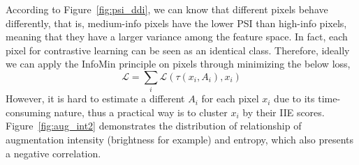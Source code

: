 \documentclass[10pt,twocolumn,letterpaper]{article}
\begin{document}

According to Figure~\ref{fig:psi_ddi}, we can know that different pixels behave differently, that is, medium-info pixels have the lower PSI than high-info pixels, meaning that they have a larger variance among the feature space. In fact, each pixel for contrastive learning can be seen as an identical class. Therefore, ideally we can apply the InfoMin principle on pixels through minimizing the below loss,
\begin{equation}
    \mathcal{L} = \sum_i \mathcal{L}(\tau(x_i, A_i), x_i)
\end{equation}
However, it is hard to estimate a different $A_i$ for each pixel $x_i$ due to its time-consuming nature, thus a practical way is to cluster $x_i$ by their IIE scores. 
Figure~\ref{fig:aug_int2} demonstrates the distribution of relationship of augmentation intensity (brightness for example) and entropy, which also presents a negative correlation. 
\end{document}
